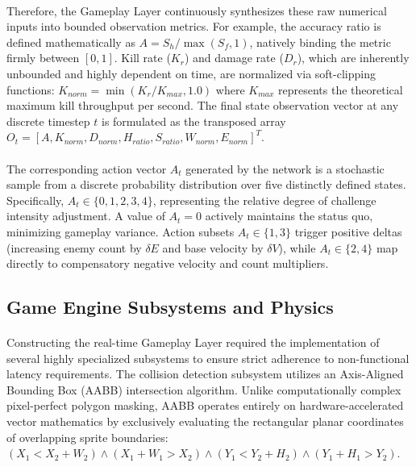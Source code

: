 \paragraph{} Therefore, the Gameplay Layer continuously synthesizes these raw numerical inputs into bounded observation metrics. For example, the accuracy ratio is defined mathematically as $A = S_h / \max(S_f, 1)$, natively binding the metric firmly between $[0, 1]$. Kill rate ($K_r$) and damage rate ($D_r$), which are inherently unbounded and highly dependent on time, are normalized via soft-clipping functions: $K_{norm} = \min(K_r / K_{max}, 1.0)$ where $K_{max}$ represents the theoretical maximum kill throughput per second. The final state observation vector at any discrete timestep $t$ is formulated as the transposed array $O_t = [A, K_{norm}, D_{norm}, H_{ratio}, S_{ratio}, W_{norm}, E_{norm}]^T$. 
\paragraph{} The corresponding action vector $A_t$ generated by the network is a stochastic sample from a discrete probability distribution over five distinctly defined states. Specifically, $A_t \in \{0, 1, 2, 3, 4\}$, representing the relative degree of challenge intensity adjustment. A value of $A_t = 0$ actively maintains the status quo, minimizing gameplay variance. Action subsets $A_t \in \{1, 3\}$ trigger positive deltas (increasing enemy count by $\delta E$ and base velocity by $\delta V$), while $A_t \in \{2, 4\}$ map directly to compensatory negative velocity and count multipliers.

\subsection{Game Engine Subsystems and Physics}
\paragraph{} Constructing the real-time Gameplay Layer required the implementation of several highly specialized subsystems to ensure strict adherence to non-functional latency requirements. The collision detection subsystem utilizes an Axis-Aligned Bounding Box (AABB) intersection algorithm. Unlike computationally complex pixel-perfect polygon masking, AABB operates entirely on hardware-accelerated vector mathematics by exclusively evaluating the rectangular planar coordinates of overlapping sprite boundaries: $(X_1 < X_2 + W_2) \wedge (X_1 + W_1 > X_2) \wedge (Y_1 < Y_2 + H_2) \wedge (Y_1 + H_1 > Y_2)$.
